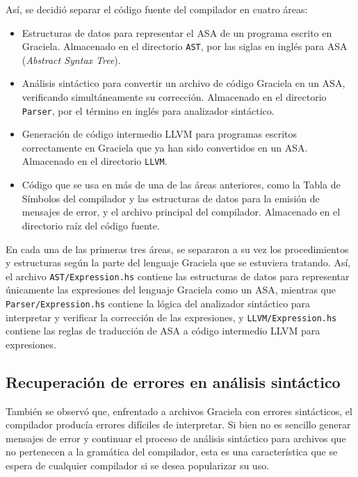 Así, se decidió separar el código fuente del compilador en cuatro áreas:
\begin{itemize}

  \item Estructuras de datos para representar el \textsc{ASA} de un programa
  escrito en Graciela. Almacenado en el directorio \texttt{AST}, por las siglas
  en inglés para \textsc{ASA} (\emph{Abstract Syntax Tree}).

  \item Análisis sintáctico para convertir un archivo de código Graciela en un
  ASA, verificando simultáneamente su corrección. Almacenado en el directorio
  \texttt{Parser}, por el término en inglés para analizador sintáctico.

  \item Generación de código intermedio LLVM para programas escritos
  correctamente en Graciela que ya han sido convertidos en un ASA. Almacenado en el
  directorio \texttt{LLVM}.

  \item Código que se usa en más de una de las áreas anteriores, como la Tabla
  de Símbolos del compilador y las estructuras de datos para la emisión de
  mensajes de error, y el archivo principal del compilador. Almacenado en el
  directorio raíz del código fuente.

\end{itemize}

En cada una de las primeras tres áreas, se separaron a su vez los procedimientos
y estructuras según la parte del lenguaje Graciela que se estuviera tratando.
Así, el archivo \texttt{AST/Expression.hs} contiene las estructuras de datos
para representar únicamente las expresiones del lenguaje Graciela como un
\textsc{ASA}, mientras que \texttt{Parser/Expression.hs} contiene la lógica del
analizador sintáctico para interpretar y verificar la corrección de las
expresiones, y \texttt{LLVM/Expression.hs} contiene las reglas de traducción de
\textsc{ASA} a código intermedio \textsc{LLVM} para expresiones.

\subsection{Recuperación de errores en análisis sintáctico}

También se observó que, enfrentado a archivos Graciela con errores sintácticos,
el compilador producía errores difíciles de interpretar. Si bien no es sencillo
generar mensajes de error y continuar el proceso de análisis sintáctico para
archivos que no pertenecen a la gramática del compilador, esta es una
característica que se espera de cualquier compilador si se desea popularizar su
uso.

